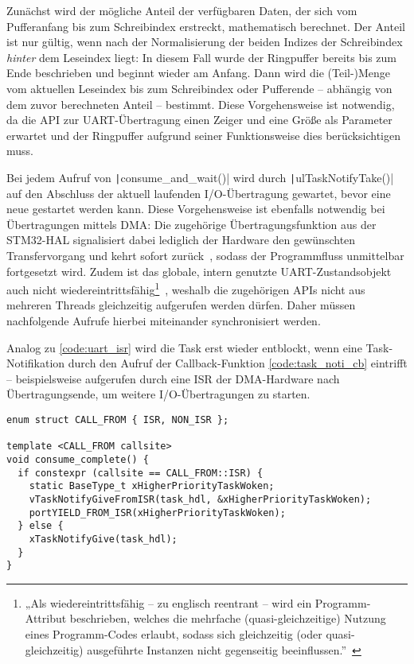 Zunächst wird der mögliche Anteil der verfügbaren Daten, der sich vom
Pufferanfang bis zum Schreibindex erstreckt, mathematisch berechnet. Der Anteil
ist nur gültig, wenn nach der Normalisierung der beiden Indizes der Schreibindex
\textit{hinter} dem Leseindex liegt: In diesem Fall wurde der Ringpuffer bereits
bis zum Ende beschrieben und beginnt wieder am Anfang. Dann wird die
(Teil-)Menge vom aktuellen Leseindex bis zum Schreibindex oder Pufferende --
abhängig von dem zuvor berechneten Anteil -- bestimmt. Diese Vorgehensweise ist
notwendig, da die API zur UART-Übertragung einen Zeiger und eine Größe als
Parameter erwartet und der Ringpuffer aufgrund seiner Funktionsweise dies
berücksichtigen muss.

Bei jedem Aufruf von \texttt|consume_and_wait()| wird durch
\texttt|ulTaskNotifyTake()| auf den Abschluss der aktuell laufenden
I/O-Übertragung gewartet, bevor eine neue gestartet werden kann. Diese
Vorgehensweise ist ebenfalls notwendig bei Übertragungen mittels DMA: Die
zugehörige Übertragungsfunktion aus der STM32-HAL signalisiert dabei lediglich
der Hardware den gewünschten Transfervorgang und kehrt sofort
zurück~\cite{HAL_UART_Transmit_DMA}, sodass der Programmfluss unmittelbar
fortgesetzt wird. Zudem ist das globale, intern genutzte UART-Zustandsobjekt
auch nicht wiedereintrittsfähig\footnote{„Als wiedereintrittsfähig -- zu
englisch reentrant -- wird ein Programm-Attribut beschrieben, welches die
mehrfache (quasi-gleichzeitige) Nutzung eines Programm-Codes erlaubt, sodass
sich gleichzeitig (oder quasi-gleichzeitig) ausgeführte Instanzen nicht
gegenseitig
beeinflussen.”~\cite{wiedereintrittsfaehigkeit}}~\cite{stm32_hal_reentrancy},
weshalb die zugehörigen APIs nicht aus mehreren Threads gleichzeitig aufgerufen
werden dürfen. Daher müssen nachfolgende Aufrufe hierbei miteinander
synchronisiert werden.

Analog zu \ref{code:uart_isr} wird die Task erst wieder entblockt, wenn eine
Task-Notifikation durch den Aufruf der Callback-Funktion \ref{code:task_noti_cb}
eintrifft -- beispielsweise aufgerufen durch eine \ac{ISR} der DMA-Hardware nach
Übertragungsende, um weitere I/O-Übertragungen zu starten.

\begin{code}
\begin{verbatim}
enum struct CALL_FROM { ISR, NON_ISR };

template <CALL_FROM callsite>
void consume_complete() {
  if constexpr (callsite == CALL_FROM::ISR) {
    static BaseType_t xHigherPriorityTaskWoken;
    vTaskNotifyGiveFromISR(task_hdl, &xHigherPriorityTaskWoken);
    portYIELD_FROM_ISR(xHigherPriorityTaskWoken);
  } else {
    xTaskNotifyGive(task_hdl);
  }
}
\end{verbatim}
    \label{code:task_noti_cb}
\end{code}

